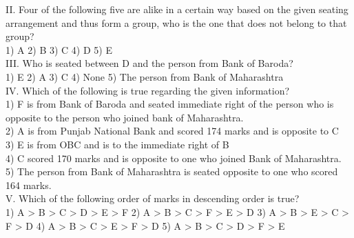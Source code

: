 \documentclass[
]{article}
\begin{document}
II. Four of the following five are alike in a certain way based on the given seating
arrangement and thus form a group, who is the one that does not belong to that group?\\
1) A \hspace{2mm}2) B \hspace{2mm}3) C \hspace{2mm}4) D \hspace{2mm}5) E\\

III. Who is seated between D and the person from Bank of Baroda?\\
1) E \hspace{2mm}2) A \hspace{2mm}3) C
\hspace{2mm}4) None \hspace{2mm}5) The person from Bank of Maharashtra\\

IV. Which of the following is true regarding the given information?\\
1) F is from Bank of Baroda and seated immediate right of the person who is opposite to
the person who joined bank of Maharashtra.\\
2) A is from Punjab National Bank and scored 174 marks and is opposite to C\\
3) E is from OBC and is to the immediate right of B\\
4) C scored 170 marks and is opposite to one who joined Bank of Maharashtra.\\
5) The person from Bank of Maharashtra is seated opposite to one who scored 164 marks.\\

V. Which of the following order of marks in descending order is true?\\
1) A > B > C > D > E > F \hspace{2mm}2) A > B > C > F > E > D
\hspace{2mm}3) A > B > E > C > F > D \hspace{2mm}4) A > B > C > E > F > D
\hspace{2mm}5) A > B > C > D > F > E\\
\end{document}
